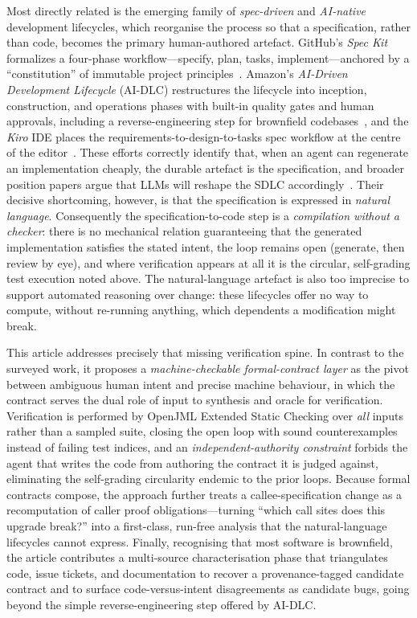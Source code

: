 Most directly related is the emerging family of \emph{spec-driven} and \emph{AI-native} development lifecycles, which reorganise the process so that a specification, rather than code, becomes the primary human-authored artefact. GitHub's \emph{Spec Kit} formalizes a four-phase workflow---specify, plan, tasks, implement---anchored by a ``constitution'' of immutable project principles~\cite{githubspeckit}. Amazon's \emph{AI-Driven Development Lifecycle} (AI-DLC) restructures the lifecycle into inception, construction, and operations phases with built-in quality gates and human approvals, including a reverse-engineering step for brownfield codebases~\cite{awsaidlc}, and the \emph{Kiro} IDE places the requirements-to-design-to-tasks spec workflow at the centre of the editor~\cite{awskiro}. These efforts correctly identify that, when an agent can regenerate an implementation cheaply, the durable artefact is the specification, and broader position papers argue that LLMs will reshape the SDLC accordingly~\cite{ozkaya2023llmse}. Their decisive shortcoming, however, is that the specification is expressed in \emph{natural language}. Consequently the specification-to-code step is a \emph{compilation without a checker}: there is no mechanical relation guaranteeing that the generated implementation satisfies the stated intent, the loop remains open (generate, then review by eye), and where verification appears at all it is the circular, self-grading test execution noted above. The natural-language artefact is also too imprecise to support automated reasoning over change: these lifecycles offer no way to compute, without re-running anything, which dependents a modification might break.

This article addresses precisely that missing verification spine. In contrast to the surveyed work, it proposes a \emph{machine-checkable formal-contract layer} as the pivot between ambiguous human intent and precise machine behaviour, in which the contract serves the dual role of input to synthesis and oracle for verification. Verification is performed by OpenJML Extended Static Checking over \emph{all} inputs rather than a sampled suite, closing the open loop with sound counterexamples instead of failing test indices, and an \emph{independent-authority constraint} forbids the agent that writes the code from authoring the contract it is judged against, eliminating the self-grading circularity endemic to the prior loops. Because formal contracts compose, the approach further treats a callee-specification change as a recomputation of caller proof obligations---turning ``which call sites does this upgrade break?'' into a first-class, run-free analysis that the natural-language lifecycles cannot express. Finally, recognising that most software is brownfield, the article contributes a multi-source characterisation phase that triangulates code, issue tickets, and documentation to recover a provenance-tagged candidate contract and to surface code-versus-intent disagreements as candidate bugs, going beyond the simple reverse-engineering step offered by AI-DLC.
